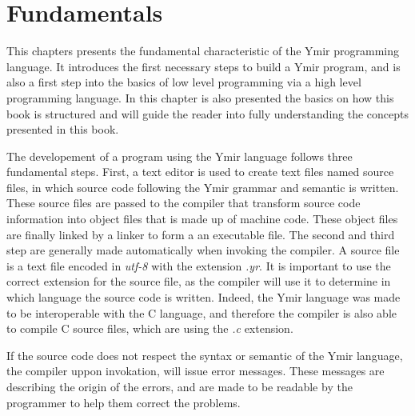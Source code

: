 \chapter{Fundamentals}
\nopagecolor{}
\label{chap:chap1}

This chapters presents the fundamental characteristic of the Ymir programming
language. It introduces the first necessary steps to build a Ymir program, and
is also a first step into the basics of low level programming via a high level
programming language. In this chapter is also presented the basics on how this
book is structured and will guide the reader into fully understanding the
concepts presented in this book.

\minitoc%

The developement of a program using the Ymir language follows three fundamental
steps. First, a text editor is used to create text files named source files, in
which source code following the Ymir grammar and semantic is written. These
source files are passed to the compiler that transform source code information
into object files that is made up of machine code. These object files are
finally linked by a linker to form a an executable file. The second and third
step are generally made automatically when invoking the compiler. A source file
is a text file encoded in \textit{utf-8} with the extension \textit{.yr}. It is
important to use the correct extension for the source file, as the compiler will
use it to determine in which language the source code is written. Indeed, the
Ymir language was made to be interoperable with the C language, and therefore
the compiler is also able to compile C source files, which are using the
\textit{.c} extension.

If the source code does not respect the syntax or semantic of the Ymir language,
the compiler uppon invokation, will issue error messages. These messages are
describing the origin of the errors, and are made to be readable by the
programmer to help them correct the problems.






